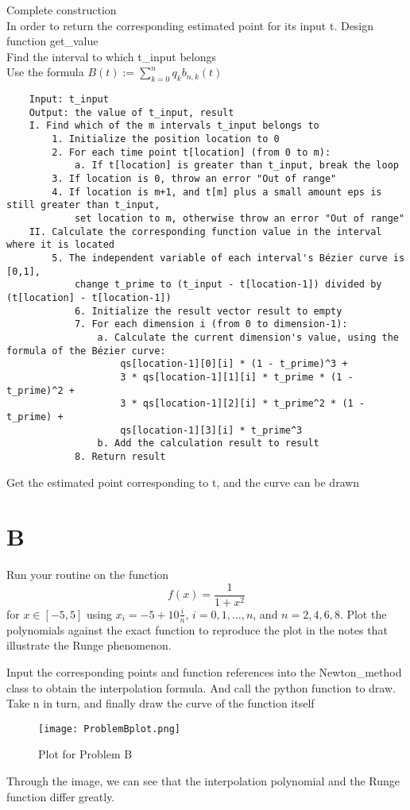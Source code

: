 \documentclass[a4paper]{article}
\begin{document}
Complete construction \\
In order to return the corresponding estimated point for its input t. Design function get\_value \\
Find the interval to which t\_input belongs \\
Use the formula $B(t) := \sum_{k=0}^{n} q_k b_{n,k}(t)$ \\
\begin{verbatim}
    Input: t_input
    Output: the value of t_input, result
    I. Find which of the m intervals t_input belongs to
        1. Initialize the position location to 0
        2. For each time point t[location] (from 0 to m):
            a. If t[location] is greater than t_input, break the loop
        3. If location is 0, throw an error "Out of range"
        4. If location is m+1, and t[m] plus a small amount eps is still greater than t_input, 
            set location to m, otherwise throw an error "Out of range"
    II. Calculate the corresponding function value in the interval where it is located
        5. The independent variable of each interval's Bézier curve is [0,1],
            change t_prime to (t_input - t[location-1]) divided by (t[location] - t[location-1])
            6. Initialize the result vector result to empty
            7. For each dimension i (from 0 to dimension-1):
                a. Calculate the current dimension's value, using the formula of the Bézier curve:
                    qs[location-1][0][i] * (1 - t_prime)^3 +
                    3 * qs[location-1][1][i] * t_prime * (1 - t_prime)^2 +
                    3 * qs[location-1][2][i] * t_prime^2 * (1 - t_prime) +
                    qs[location-1][3][i] * t_prime^3
                b. Add the calculation result to result
            8. Return result
    \end{verbatim}
    Get the estimated point corresponding to t, and the curve can be drawn \\
    
    
    \section*{B}
    Run your routine on the function
    \[
    f(x) = \frac{1}{1 + x^2}
    \]
    for $x \in [-5,5]$ using $x_i = -5 + 10\frac{i}{n}$, $i = 0, 1, \ldots, n$, and $n = 2, 4, 6, 8$. Plot the polynomials against the exact function to reproduce the plot in the notes that illustrate the Runge phenomenon.
    
    Input the corresponding points and function references into the Newton\_method class to obtain the interpolation formula.
    And call the python function to draw. \\
    Take n in turn, and finally draw the curve of the function itself \\
    \begin{figure}[H]
        \centering 
        \texttt{[image: ProblemBplot.png]} 
        \caption{Plot for Problem B}  
    \end{figure}
    Through the image, we can see that the interpolation polynomial and the Runge function differ greatly.\\
    
\end{document}
